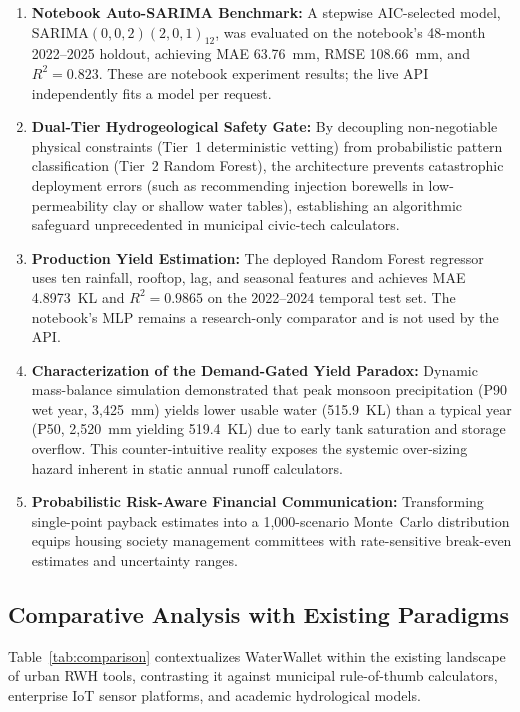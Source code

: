 ﻿\documentclass[conference]{IEEEtran}
\begin{document}
\begin{enumerate}
  \item \textbf{Notebook Auto-SARIMA Benchmark:} A stepwise AIC-selected model, $\mathrm{SARIMA}(0,0,2)(2,0,1)_{12}$, was evaluated on the notebook's 48-month 2022--2025 holdout, achieving MAE 63.76~mm, RMSE 108.66~mm, and $R^2=0.823$. These are notebook experiment results; the live API independently fits a model per request.
  
  \item \textbf{Dual-Tier Hydrogeological Safety Gate:} By decoupling non-negotiable physical constraints (Tier~1 deterministic vetting) from probabilistic pattern classification (Tier~2 Random Forest), the architecture prevents catastrophic deployment errors (such as recommending injection borewells in low-permeability clay or shallow water tables), establishing an algorithmic safeguard unprecedented in municipal civic-tech calculators.
  
  \item \textbf{Production Yield Estimation:} The deployed Random Forest regressor uses ten rainfall, rooftop, lag, and seasonal features and achieves MAE 4.8973~KL and $R^2=0.9865$ on the 2022--2024 temporal test set. The notebook's MLP remains a research-only comparator and is not used by the API.
  
  \item \textbf{Characterization of the Demand-Gated Yield Paradox:} Dynamic mass-balance simulation demonstrated that peak monsoon precipitation (P90 wet year, 3,425~mm) yields lower usable water (515.9~KL) than a typical year (P50, 2,520~mm yielding 519.4~KL) due to early tank saturation and storage overflow. This counter-intuitive reality exposes the systemic over-sizing hazard inherent in static annual runoff calculators.
  
  \item \textbf{Probabilistic Risk-Aware Financial Communication:} Transforming single-point payback estimates into a 1,000-scenario Monte~Carlo distribution equips housing society management committees with rate-sensitive break-even estimates and uncertainty ranges.
\end{enumerate}

\subsection{Comparative Analysis with Existing Paradigms}

Table~\ref{tab:comparison} contextualizes WaterWallet within the existing landscape of urban RWH tools, contrasting it against municipal rule-of-thumb calculators, enterprise IoT sensor platforms, and academic hydrological models.
\end{document}
